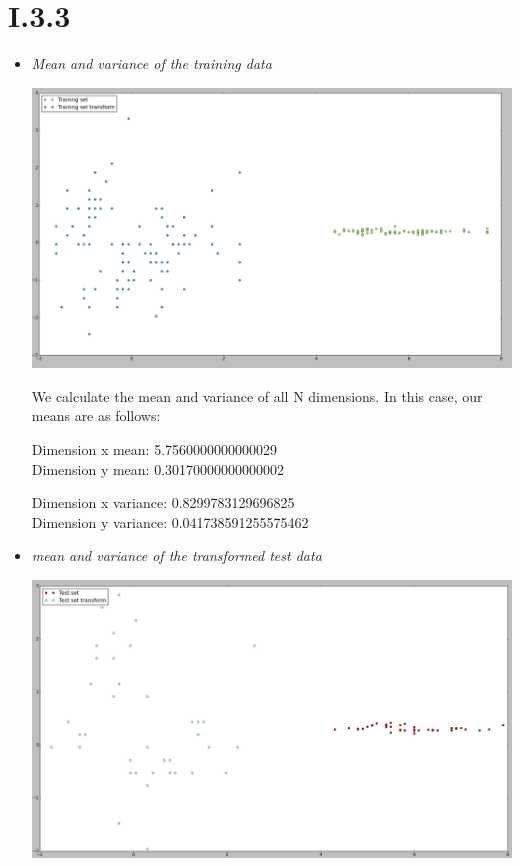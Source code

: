 \documentclass[12pt, a4paper]{article}
\begin{document}
\newpage
\section{I.3.3}
\begin{itemize}
\item \textit{Mean and variance of the training data}

\includegraphics[width=\textwidth]{8.png}

We calculate the mean and variance of all N dimensions. In this case, our means are as follows:

Dimension x mean: 5.7560000000000029 \\
Dimension y mean: 0.30170000000000002

Dimension x variance: 0.8299783129696825 \\
Dimension y variance: 0.041738591255575462

\item \textit{mean and variance of the transformed test data}

\includegraphics[width=\textwidth]{9.png}


\end{itemize}
\end{document}
